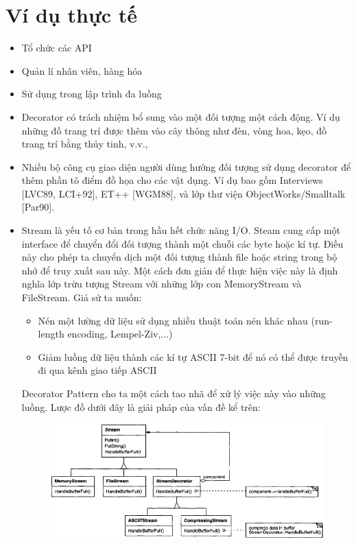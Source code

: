 \section{Ví dụ thực tế}
\begin{itemize}
    \item Tổ chức các API
    \item Quản lí nhân viên, hàng hóa
    \item Sử dụng trong lập trình đa luồng
    \item Decorator có trách nhiệm bổ sung vào một đối tượng một cách động. Ví dụ những đồ trang trí được thêm vào cây thông như đèn, vòng hoa, kẹo, đồ trang trí bằng thủy tinh, v.v.,
    \item Nhiều bộ công cụ giao diện người dùng hướng đối tượng sử dụng decorator để thêm phần tô điểm đồ họa cho các vật dụng. Ví dụ bao gồm Interviews [LVC89, LCI+92], ET++ [WGM88], và lớp thư viện ObjectWorks/Smalltalk [Par90].
    \item Stream là yếu tố cơ bản trong hầu hết chức năng I/O. Steam cung cấp một interface để chuyển đổi đối tượng thành một chuỗi các byte hoặc kí tự. Điều này cho phép ta chuyển dịch một đối tượng thành file hoặc string trong bộ nhớ để truy xuất sau này. Một cách đơn giản để thực hiện việc này là định nghĩa lớp trừu tượng Stream với những lớp con MemoryStream và FileStream. Giả sử ta muốn:
    \begin{itemize}
        \item Nén một lường dữ liệu sử dụng nhiều thuật toán nén khác nhau (run-length encoding, Lempel-Ziv,...)
        \item Giảm luồng dữ liệu thành các kí tự ASCII 7-bit để nó có thể được truyền đi qua kênh giao tiếp ASCII
    \end{itemize}
    Decorator Pattern cho ta một cách tao nhã để xử lý việc này vào những luồng. Lược đồ dưới đây là giải pháp của vấn đề kể trên:\\
    \begin{figure}[!htb]
        \centering
        \includegraphics[width=\textwidth]{fig/Decorator/hmm.png}
    \end{figure}
    

\end{itemize}
